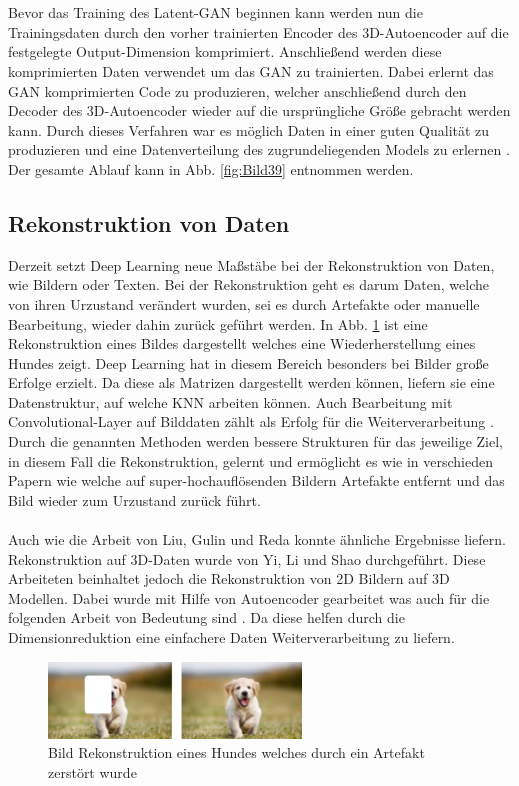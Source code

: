 \documentclass{llncs}
\begin{document}
\\\\
Bevor das Training des Latent-GAN beginnen kann werden nun die Trainingsdaten durch den vorher trainierten Encoder des 3D-Autoencoder auf die festgelegte Output-Dimension komprimiert. Anschließend werden diese komprimierten Daten verwendet um das GAN zu trainierten. Dabei erlernt das GAN komprimierten Code zu produzieren, welcher anschließend durch den Decoder des 3D-Autoencoder wieder auf die ursprüngliche Größe gebracht werden kann. Durch dieses Verfahren war es möglich Daten in einer guten Qualität zu produzieren und eine Datenverteilung des zugrundeliegenden Models zu erlernen \cite{3dgan}. Der gesamte Ablauf kann in Abb. \ref{fig:Bild39} entnommen werden. 

\subsection{Rekonstruktion von Daten}\label{sec:rekdaten}

Derzeit setzt Deep Learning neue Maßstäbe bei der Rekonstruktion von Daten, wie Bildern oder Texten. Bei der Rekonstruktion geht es darum Daten, welche von ihren Urzustand verändert wurden, sei es durch Artefakte oder manuelle Bearbeitung, wieder dahin zurück geführt werden. In Abb. \ref{fig:Bild40} ist eine Rekonstruktion eines Bildes dargestellt welches eine Wiederherstellung eines Hundes zeigt. Deep Learning hat in diesem Bereich besonders bei Bilder große Erfolge erzielt. Da diese als Matrizen dargestellt werden können, liefern sie eine Datenstruktur, auf welche KNN arbeiten können. Auch Bearbeitung mit Convolutional-Layer auf Bilddaten zählt als Erfolg für die Weiterverarbeitung \cite{imagerecon}. Durch die genannten Methoden werden bessere Strukturen für das jeweilige Ziel, in diesem Fall die Rekonstruktion, gelernt und ermöglicht es wie in verschieden Papern wie \cite{imagere1}  welche auf super-hochauflösenden Bildern Artefakte entfernt und das Bild wieder zum Urzustand zurück führt.
\\\\
Auch wie die Arbeit von Liu, Gulin und Reda \cite{imagere2} konnte ähnliche Ergebnisse liefern. Rekonstruktion auf 3D-Daten wurde von Yi, Li und Shao \cite{3d_recon} durchgeführt. Diese Arbeiteten beinhaltet jedoch die Rekonstruktion von 2D Bildern auf 3D Modellen. Dabei wurde mit Hilfe von Autoencoder gearbeitet was auch für die folgenden Arbeit von Bedeutung sind \cite{3d_recon}. Da diese helfen durch die Dimensionreduktion eine einfachere Daten Weiterverarbeitung zu liefern.
\begin{figure}[htbp] 
	\centering
	\includegraphics[width=0.6\textwidth]{imagere.png}
	\caption{Bild Rekonstruktion eines Hundes welches durch ein Artefakt zerstört wurde}
	\label{fig:Bild40}
\end{figure}
\newpage
\end{document}
